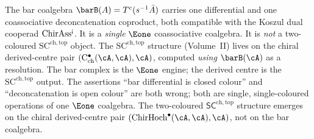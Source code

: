 \begin{warning}
\label{warn:bar-not-sc-coalgebra}
The bar coalgebra
$\barB(A) = T^c(s^{-1}\bar{A})$ carries one differential and
one coassociative deconcatenation coproduct, both compatible
with the Koszul dual cooperad
$\mathrm{ChirAss}^{\text{\textexclamdown}}$. It is a
\emph{single} $\Eone$ coassociative coalgebra. It is
\emph{not} a two-coloured $\mathrm{SC}^{\mathrm{ch,top}}$ object. The
$\mathrm{SC}^{\mathrm{ch,top}}$ structure (Volume~II) lives on
the chiral derived-centre pair
$(\mathrm{C}^{\bullet}_{\mathrm{ch}}(\cA, \cA), \cA)$, computed
\emph{using} $\barB(\cA)$ as a resolution. The bar complex is
the $\Eone$ engine; the derived centre is the
$\mathrm{SC}^{\mathrm{ch,top}}$ output. The assertions
``bar differential is closed colour'' and
``deconcatenation is open colour'' are both wrong; both are
single, single-coloured operations of one $\Eone$
coalgebra. The two-coloured $\mathsf{SC}^{\mathrm{ch,top}}$
structure emerges on the chiral derived-centre pair
$(\mathrm{ChirHoch}^\bullet(\cA, \cA), \cA)$, not on the bar
coalgebra.
\end{warning}

